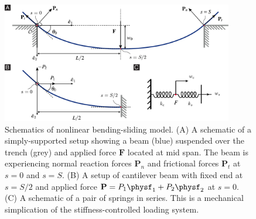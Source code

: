 \begin{figure}[H]
\centering
\includegraphics[width=0.9\textwidth]{Figures/BeamSchematic_V10.pdf}
\caption{Schematics of nonlinear bending-sliding model.
(\textsf{A}) A schematic of a simply-supported setup showing a beam (blue) suspended over the trench (grey) and applied force $\mathbf{F}$ located at mid span. The beam is experiencing normal reaction forces $\mathbf{P}_n$ and frictional forces $\mathbf{P}_t$ at $s = 0$ and $s = S$.
(\textsf{B}) A setup of cantilever beam with fixed end at $s = S/2$ and applied force $\mathbf{P} = P_1 \physf_1 + P_2 \physf_2 $ at $s = 0$.
(\textsf{C}) A schematic of a pair of springs in series. This is a mechanical simplication of the stiffness-controlled loading system.
}
\label{fig:BeamSchematic}
\end{figure}

